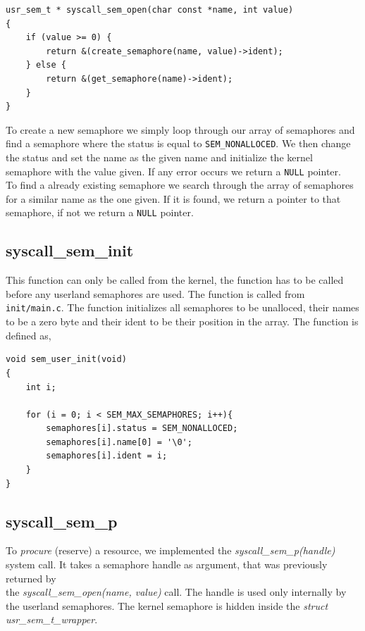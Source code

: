 \documentclass[11pt]{article}
\begin{document}
    \begin{lstlisting}[style=customc]
usr_sem_t * syscall_sem_open(char const *name, int value)
{
    if (value >= 0) {
        return &(create_semaphore(name, value)->ident);
    } else {
        return &(get_semaphore(name)->ident);
    }
}
    \end{lstlisting}

    To create a new semaphore we simply loop through our array of semaphores and
    find a semaphore where the status is equal to \texttt{SEM\_NONALLOCED}.  We
    then change the status and set the name as the given name and initialize the
    kernel semaphore with the value given.  If any error occurs we return a
    \texttt{NULL} pointer. \\

    To find a already existing semaphore we search through the array of
    semaphores for a similar name as the one given.  If it is found, we return
    a pointer to that semaphore, if not we return a \texttt{NULL} pointer.

    \subsection{syscall\_sem\_init}
    This function can only be called from the kernel, the function has to be
    called before any userland semaphores are used.  The function is called from
    \texttt{init/main.c}.  The function initializes all semaphores to be
    unalloced, their names to be a zero byte and their ident to be their
    position in the array.  The function is defined as,

    \begin{lstlisting}[style=customc]
void sem_user_init(void)
{
    int i;

    for (i = 0; i < SEM_MAX_SEMAPHORES; i++){
        semaphores[i].status = SEM_NONALLOCED;
        semaphores[i].name[0] = '\0';
        semaphores[i].ident = i;
    }
}
    \end{lstlisting}

\subsection{syscall\_sem\_p}
To \emph{procure} (reserve) a resource, we implemented the \emph{syscall\_sem\_p(handle)} system call. It takes a semaphore handle as argument, that was previously returned by \\ the \emph{syscall\_sem\_open(name, value)} call. The handle is used only internally by the userland semaphores. The kernel semaphore is hidden inside the \emph{struct usr\_sem\_t\_wrapper}.
\end{document}
